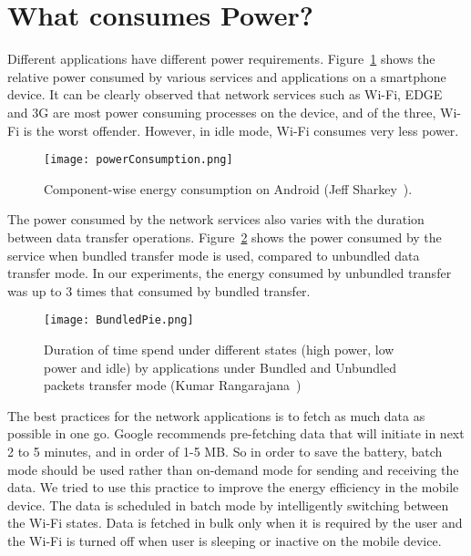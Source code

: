 \section{What consumes Power?}
\label{sec:WCP}
Different applications have different power requirements. Figure~\ref{fig:chart} shows the relative power consumed by various services and applications on a smartphone device. It can be clearly observed that network services such as
Wi-Fi, EDGE and 3G are most power consuming processes on the device, and of the three, Wi-Fi is the worst offender.
However, in idle mode, Wi-Fi consumes very less power.

\begin{figure}[ht]
\centering
\texttt{[image: powerConsumption.png]}
\caption{Component-wise energy consumption on Android (Jeff Sharkey~\cite{bworld}).}
\label{fig:chart}
\end{figure}

The power consumed by the network services also varies with the duration between data transfer operations. 
Figure~\ref{fig:pie}  shows the power consumed by the service when bundled transfer
mode is used, compared to unbundled data transfer mode. In our experiments, the energy consumed
by unbundled transfer was up to 3 times that consumed by bundled transfer.

\begin{figure}
\centering
\texttt{[image: BundledPie.png]}
\caption{Duration of time spend under different states (high power, low power and idle) by applications under Bundled and Unbundled packets transfer mode (Kumar Rangarajana~\cite{battery})}
\label{fig:pie}
\end{figure}

The best practices for the network applications is to fetch as much data as possible in one go. Google recommends pre-fetching data that will initiate in next 2 to 5 minutes, and in order of 1-5 MB. So in order to save the battery, batch mode should be used rather than on-demand mode for sending and receiving the data. We tried to use this practice to improve the energy efficiency in the mobile device. The data is scheduled in batch mode by intelligently switching between the Wi-Fi states. Data is fetched in bulk only when it is required by the user and the Wi-Fi is turned off when user is sleeping or inactive on the mobile device.

